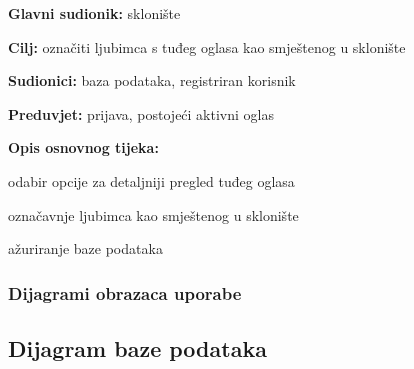 						\noindent {}
					\begin{packed_item}
						
						\item \textbf{Glavni sudionik: } sklonište
						\item  \textbf{Cilj:} označiti ljubimca s tuđeg oglasa kao smještenog u sklonište
						\item  \textbf{Sudionici:} baza podataka, registriran korisnik
						\item  \textbf{Preduvjet:} prijava, postojeći aktivni oglas
						\item  \textbf{Opis osnovnog tijeka:}
						
						\item[] \begin{packed_enum}
							
							\item odabir opcije za detaljniji pregled tuđeg oglasa
							\item označavnje ljubimca kao smještenog u sklonište
							\item ažuriranje baze podataka
						\end{packed_enum}
						
					\end{packed_item}
					
					
					
					
					
				\subsubsection{Dijagrami obrazaca uporabe}
					
					\subsection{Dijagram baze podataka}
					
